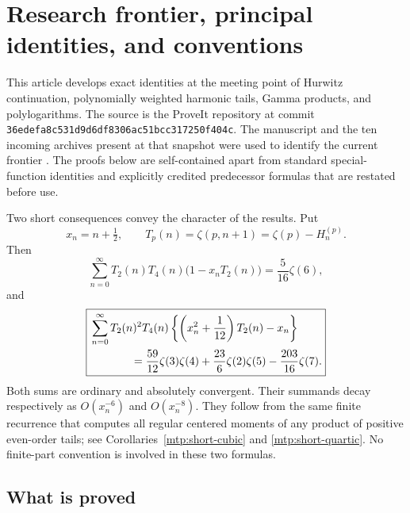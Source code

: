 \documentclass[11pt,letterpaper]{article}
\numberwithin{equation}{section}
\theoremstyle{definition}
\theoremstyle{remark}
\begin{document}
\section{Research frontier, principal identities, and conventions}
\label{sec:overview}

This article develops exact identities at the meeting point of
Hurwitz continuation, polynomially weighted harmonic tails, Gamma
products, and polylogarithms. The source is the ProveIt repository
at commit
\texttt{36edefa8c531d9d6df8306ac51bcc317250f404c}.
The manuscript and the ten incoming archives present at that snapshot
were used to identify the current frontier
\cite{RepoManuscript,RepoIncoming}. The proofs below are self-contained
apart from standard special-function identities and explicitly
credited predecessor formulas that are restated before use.

Two short consequences convey the character of the results. Put
\[
 x_n=n+\tfrac12,\qquad
 T_p(n)=\zeta(p,n+1)=\zeta(p)-H_n^{(p)}.
\]
Then
\begin{equation}\label{eq:overview-cubic}
 \boxed{\sum_{n=0}^{\infty}T_2(n)T_4(n)
                  \bigl(1-x_nT_2(n)\bigr)=\frac5{16}\zeta(6),}
\end{equation}
and
\begin{equation}\label{eq:overview-quartic}
 \boxed{\begin{aligned}
 &\sum_{n=0}^{\infty}T_2(n)^2T_4(n)
       \left\{\left(x_n^2+\frac1{12}\right)T_2(n)-x_n\right\}\\
 &\hspace{13mm}
 =\frac{59}{12}\zeta(3)\zeta(4)
       +\frac{23}{6}\zeta(2)\zeta(5)-\frac{203}{16}\zeta(7).
 \end{aligned}}
\end{equation}
Both sums are ordinary and absolutely convergent. Their summands
decay respectively as \(O(x_n^{-6})\) and \(O(x_n^{-8})\).
They follow from the same finite recurrence that computes all
regular centered moments of any product of positive even-order tails;
see Corollaries~\ref{mtp:short-cubic} and \ref{mtp:short-quartic}.
No finite-part convention is involved in these two formulas.

\subsection{What is proved}
\end{document}
